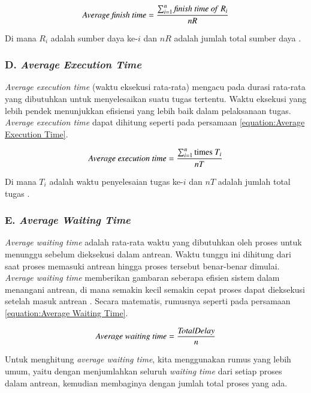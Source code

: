 \begin{equation}
\label{equation:Average Finish Time}
    \text{\textit{Average finish time}} = \frac{\sum_{i=1}^{n} \text{\textit{finish time of} } R_i}{nR}
\end{equation}

Di mana $R_i$ adalah sumber daya ke-$i$ dan $nR$ adalah jumlah total sumber daya \parencite{Ciptaningtyas2024}.

\subsubsection{D. \textit{Average Execution Time}}
\textit{Average execution time} (waktu eksekusi rata-rata) mengacu pada durasi rata-rata yang dibutuhkan untuk menyelesaikan suatu tugas tertentu. Waktu eksekusi yang lebih pendek menunjukkan efisiensi yang lebih baik dalam pelaksanaan tugas. \textit{Average execution time} dapat dihitung seperti pada persamaan \ref{equation:Average Execution Time}.

\begin{equation}
\label{equation:Average Execution Time}
    \text{\textit{Average execution time}} = \frac{\sum_{i=1}^{n} \text{times } T_i}{nT}
\end{equation}

Di mana $T_i$ adalah waktu penyelesaian tugas ke-$i$ dan $nT$ adalah jumlah total tugas \parencite{Ciptaningtyas2024}.

\subsubsection{E. \textit{Average Waiting Time}}
\textit{Average waiting time} adalah rata-rata waktu yang dibutuhkan oleh proses untuk menunggu sebelum dieksekusi dalam antrean. Waktu tunggu ini dihitung dari saat proses memasuki antrean hingga proses tersebut benar-benar dimulai. \textit{Average waiting time} memberikan gambaran seberapa efisien sistem dalam menangani antrean, di mana semakin kecil semakin cepat proses dapat dieksekusi setelah masuk antrean \parencite{Belferik2025}. Secara matematis, rumusnya seperti pada persamaan \ref{equation:Average Waiting Time}.

\begin{equation}
\label{equation:Average Waiting Time}
    \text {\textit{Average waiting time}} = \frac{\text{\textit{TotalDelay}}}{n}
\end{equation}

Untuk menghitung \textit{average waiting time}, kita menggunakan rumus yang lebih umum, yaitu dengan menjumlahkan seluruh \textit{waiting time} dari setiap proses dalam antrean, kemudian membaginya dengan jumlah total proses yang ada. 

